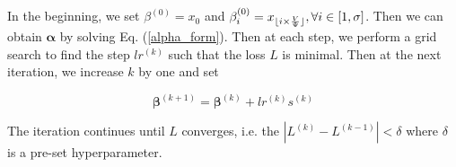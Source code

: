 In the beginning, we set $\beta^{(0)}=x_0$ and $\beta_i^{(0)}=x_{\lfloor i\times \frac{V}{\Psi}\rfloor}, \forall i\in[1,\sigma]$. Then we can obtain $\boldsymbol{\alpha}$ by solving Eq. (\ref{alpha_form}). Then at each step, we perform a grid search to find the step $lr^{(k)}$ such that the loss $L$ is minimal. Then at the next iteration, we increase $k$ by one and set 

$$
\boldsymbol{\beta}^{(k+1)}=\boldsymbol{\beta}^{(k)} + lr^{(k)}s^{(k)}
$$

The iteration continues until $L$ converges, i.e. the $|L^{(k)}-L^{(k-1)}|<\delta$ where $\delta$ is a pre-set hyperparameter.



























